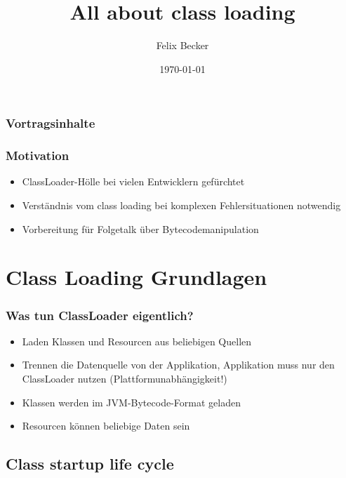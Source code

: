 \documentclass[aspectratio=169]{beamer}
\title{All about class loading}
\author{Felix Becker}
\date{\today}
\institute{REWE Systems}
\begin{document}
\maketitle


\begin{frame}
	\frametitle{Vortragsinhalte}
	\tableofcontents
\end{frame}

\begin{frame}
	\frametitle{Motivation}
	\begin{itemize}
		\item{ClassLoader-Hölle bei vielen Entwicklern gefürchtet}
		\item{Verständnis vom class loading bei komplexen Fehlersituationen notwendig}
		\item{Vorbereitung für Folgetalk über Bytecodemanipulation}
	\end{itemize}
\end{frame}

\section{Class Loading Grundlagen}

\begin{frame}
	\frametitle{Was tun ClassLoader eigentlich?}
	\begin{itemize}
		\item{Laden Klassen und Resourcen aus beliebigen Quellen}
		\item{Trennen die Datenquelle von der Applikation, Applikation muss nur den ClassLoader nutzen (Plattformunabhängigkeit!)}
		\item{Klassen werden im JVM-Bytecode-Format geladen}
		\item{Resourcen können beliebige Daten sein}
	\end{itemize}
\end{frame}

\subsection{Class startup life cycle}
\end{document}
